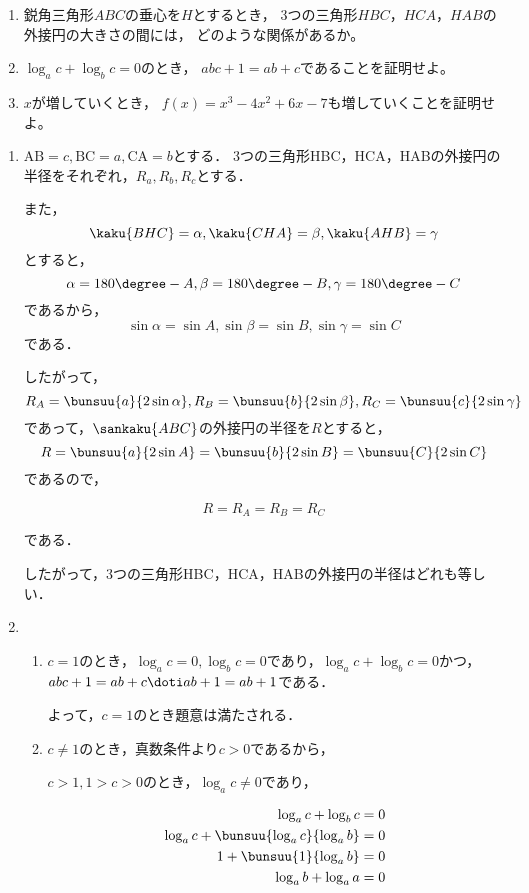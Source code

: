 \begin{problem}
\begin{enumerate}
    \item 鋭角三角形$ABC$の垂心を$H$とするとき，
    3つの三角形$HBC$，$HCA$，$HAB$の外接円の大きさの間には，
    どのような関係があるか。
    \item $\log_ac+\log_bc=0$のとき，
    $abc+1=ab+c$であることを証明せよ。
    \item $x$が増していくとき，
    $f(x)=x^3-4x^2+6x-7$も増していくことを証明せよ。
\end{enumerate}
\end{problem}

\begin{enumerate}
    \item $\mathrm{AB} = c, \mathrm{BC} = a, \mathrm{CA} = b$とする．
    3つの三角形HBC，HCA，HABの外接円の半径をそれぞれ，$R_a,R_b,R_c$とする．

また，\[\kaku{BHC} = \alpha, \kaku{CHA} = \beta,\kaku{AHB} = \gamma\]とすると，
\[\alpha = 180\degree - A, \beta = 180\degree - B,
\gamma = 180\degree - C\]であるから，
\[\sin\alpha = \sin A,\sin\beta = \sin B, \sin\gamma = \sin C\]である．

したがって，\[R_A = \bunsuu{a}{2\sin\alpha}, R_B = \bunsuu{b}{2\sin\beta}, R_C = \bunsuu{c}{2\sin\gamma}\]であって，$\sankaku{ABC}$の外接円の半径を$R$とすると，\[R = \bunsuu{a}{2\sin A} = \bunsuu{b}{2\sin B} = \bunsuu{C}{2\sin C}\]であるので，

\[R = R_A = R_B = R_C\]

である．

したがって，3つの三角形HBC，HCA，HABの外接円の半径はどれも等しい．
\hfill
{}

\vspace{1zw}

\item
\begin{enumerate}
    \item $c=1$のとき，$\log_ac=0, \log_bc=0$であり，$\log_ac + \log_bc = 0$かつ，$abc + 1 = ab + c \doti ab + 1 = ab + 1$である．

よって，$c=1$のとき題意は満たされる．

\item $c \neq 1$のとき，真数条件より$c>0$であるから，

$c>1, 1>c>0$のとき，$\log_ac \neq 0$であり，

\begin{align*}
    \log_ac + \log_bc &=0\\
    \log_ac + \bunsuu{\log_ac}{\log_ab} &= 0\\
    1 + \bunsuu{1}{\log_ab} &=0\\
    \log_a{b} + \log_a{a} &=0
\end{align*}


\end{enumerate}
\end{enumerate}
